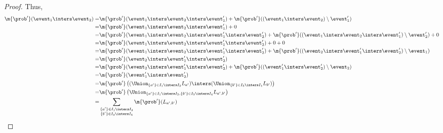 \begin{proof}
      Thus,
      \begin{align*}
         \m{\prob'}(\event_1 \inters \event_2)
        =& \m{\prob'}(\event_1 \inters \event_2 \inters \event'_1)
        + \m{\prob'}((\event_1 \inters \event_2) \setminus \event'_1)\\
        =& \m{\prob'}(\event_1 \inters \event_2 \inters \event'_1)
        + 0 \\
        =& \m{\prob'}(\event_1 \inters \event_2 \inters \event'_1 \inters \event'_2) + \m{\prob'}((\event_1 \inters \event_2 \inters \event'_1) \setminus \event'_2) + 0 \\
        =& \m{\prob'}(\event_1 \inters \event_2 \inters \event'_1 \inters \event'_2) + 0 + 0 \\
        =&  \m{\prob'}(\event_1 \inters \event_2 \inters \event'_1 \inters \event'_2) +  \m{\prob'}((\event_2 \inters \event'_1 \inters \event'_2 ) \setminus \event_1) \\
        =&  \m{\prob'}(\event_2 \inters \event'_1 \inters \event'_2)  \\
        =&  \m{\prob'}(\event_2 \inters \event'_1 \inters \event'_2) + \m{\prob'}((\event'_1 \inters \event'_2 ) \setminus \event_2) \\
        =&  \m{\prob'}(\event'_1 \inters \event'_2) \\
        =&  \m{\prob'}\left((\Union_{\{a'\} \in I_1 \inters I_2} L_{a'}) \inters (\Union_{\{b'\} \in I_3 \inters I_4} L_{b'})\right) \\
         =&  \m{\prob'}\left(\Union_{\{a'\} \in I_1 \inters I_2, \{b'\} \in I_3 \inters I_4} L_{a', b'}\right) \\
         =&  \sum_{\substack{\{a'\} \in I_1 \inters I_2 \\ \{b'\} \in I_3 \inters I_4}} \m{\prob'}(L_{a', b'})
       \end{align*}


\end{proof}
